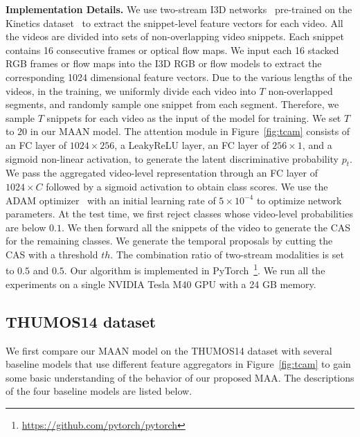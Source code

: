 \documentclass{article} \usepackage{iclr2019_conference,times}
\begin{document}
\textbf{Implementation Details.}
We use two-stream I3D networks~\citep{I3D} pre-trained on the Kinetics dataset~\citep{kinetics} to extract the snippet-level feature vectors for each video. 
All the videos are divided into sets of non-overlapping video snippets. Each snippet contains 16 consecutive frames or optical flow maps. We input each 16 stacked RGB frames or flow maps into the I3D RGB or flow models to extract the corresponding 1024 dimensional feature vectors. Due to the various lengths of the videos, in the training, we uniformly divide each video into $ T $ non-overlapped segments, and randomly sample one snippet from each segment. Therefore, we sample $ T $ snippets for each video as the input of the model for training. We set $ T $ to $ 20 $ in our MAAN model. The attention module in Figure~\ref{fig:tcam} consists of an FC layer of $1024 \times 256$, a LeakyReLU layer, an FC layer of $256 \times 1$, and a sigmoid non-linear activation, to generate the latent discriminative probability $p_{t}$. We pass the aggregated video-level representation through an FC layer of $ 1024 \times C$ followed by a sigmoid activation to obtain class scores. We use the ADAM optimizer~\citep{adam} with an initial learning rate of $ 5\times 10^{-4} $ to optimize network parameters. At the test time, we first reject classes whose video-level probabilities are below $0.1$. We then forward all the snippets of the video to generate the CAS for the remaining classes. We generate the temporal proposals by cutting the CAS with a threshold $ th $. The combination ratio of two-stream modalities is set to $ 0.5 $ and $ 0.5 $. Our algorithm is implemented in PyTorch~\footnote{\url{https://github.com/pytorch/pytorch}}. We run all the experiments on a single NVIDIA Tesla M40 GPU with a 24 GB memory. 



\subsection{THUMOS14 dataset}
We first compare our MAAN model on the THUMOS14 dataset with several baseline models that use different feature aggregators in Figure~\ref{fig:tcam} to gain some basic understanding of the behavior of our proposed MAA. The descriptions of the four baseline models are listed below.
\end{document}
